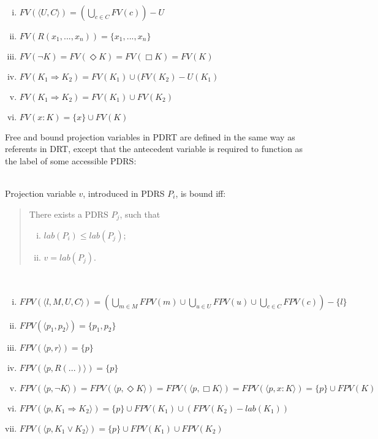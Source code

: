 \begin{definition}~ %
  \begin{enumerate}[i.]
    \item $FV(\langle U, C \rangle) = (\bigcup_{c\in C} FV(c)) - U$
    \item $FV(R(x_1,...,x_n)) = \{x_1,...,x_n\}$
    \item $FV(\neg K) = FV(\Diamond K) = FV(\Box K) = FV(K)$
    \item $FV(K_1 \Rightarrow K_2) = FV(K_1) \cup (FV(K_2) - U(K_1)$
    \item $FV(K_1 \Rightarrow K_2) = FV(K_1) \cup FV(K_2)$
    \item $FV(x:K) = \{x\} \cup FV(K)$
  \end{enumerate}
\end{definition}


Free and bound projection variables in PDRT are defined in the same way as
referents in DRT, except that the antecedent variable is required to
function as the label of some accessible PDRS:

\begin{definition}~\\
Projection variable $v$, introduced in PDRS $P_i$, is bound iff:
\begin{quote}
There exists a PDRS $P_j$, such that
\begin{enumerate}[i.]
  \item $lab(P_i) \leq lab(P_j)$; 
  \item $v = lab(P_j)$.
\end{enumerate}
\end{quote}
\end{definition}

\begin{definition}~
  \begin{enumerate}[i.]
    \item $FPV(\langle l, M, U, C \rangle) 
      = (\bigcup_{m\in M} FPV(m) \cup \bigcup_{u\in U} FPV(u) 
      \cup \bigcup_{c\in C} FPV(c)) - \{l\}$
    \item $FPV(\langle p_1, p_2\rangle) = \{p_1, p_2\}$
    \item $FPV(\langle p, r\rangle) = \{p\}$
    \item $FPV(\langle p, R(...)\rangle) = \{p\}$
    \item $FPV(\langle p,\neg K\rangle) = FPV(\langle p,\Diamond K\rangle)
      = FPV(\langle p,\Box K\rangle) = FPV(\langle p,x:K\rangle) 
      = \{p\} \cup FPV(K)$
    \item $FPV(\langle p,K_1 \Rightarrow K_2\rangle) 
      = \{p\}\cup FPV(K_1) \cup (FPV(K_2) - lab(K_1))$
    \item $FPV(\langle p,K_1 \vee K_2\rangle) 
      = \{p\}\cup FPV(K_1) \cup FPV(K_2)$
  \end{enumerate}
\end{definition}


